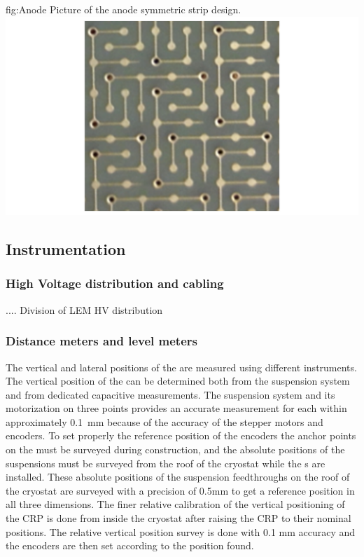 \begin{dunefigure}
{fig:Anode}
{Picture of the anode symmetric \twod strip design.}
  \includegraphics[width=.7\textwidth]{graphics/Anode_strips}
\end{dunefigure}

\subsection{Instrumentation}
\label{sec:fddp-crp-instr}

\subsubsection{High Voltage distribution and cabling}

.... Division of LEM HV distribution

\subsubsection{Distance meters and level meters}

The vertical and lateral positions of the  are measured using different instruments. 
The vertical position of the  can be determined both from the suspension system and from dedicated capacitive measurements.
The  suspension system and its motorization on three points provides an accurate measurement for each  within approximately \SI{0.1}{mm} because of the accuracy of the stepper motors and encoders. 
To set properly the reference position of the encoders the anchor points on the  must be surveyed during construction, and the absolute positions of the suspensions must be surveyed from the roof of the cryostat while the \fdth{}s are installed. These absolute positions of the suspension feedthroughs on the roof of the cryostat are surveyed with a precision of 0.5mm to get a reference position in all three dimensions. The finer relative calibration of the vertical positioning of the CRP is done from inside the cryostat after raising the CRP to their nominal positions. The relative vertical position survey is done with 0.1 mm accuracy and the encoders are then set according to the position found.

